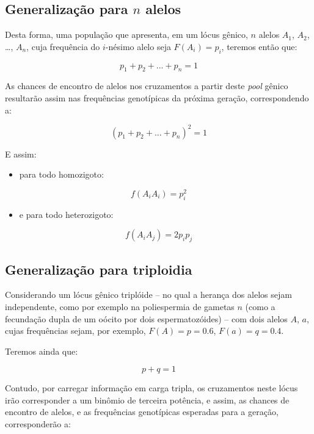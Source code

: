 \documentclass[
]{book}
\providecommand{\tightlist}{%
  \setlength{\itemsep}{0pt}\setlength{\parskip}{0pt}}
\begin{document}
\hypertarget{generalizauxe7uxe3o-para-n-alelos}{%
\subsection{\texorpdfstring{Generalização para \(n\) alelos}{Generalização para n alelos}}\label{generalizauxe7uxe3o-para-n-alelos}}

Desta forma, uma população que apresenta, em um lócus gênico, \(n\) alelos \(A_1\), \(A_2\), \ldots, \(A_n\), cuja frequência do \(i\)-nésimo alelo seja \(F(A_i) = p_i\), teremos então que:

\[p_1 + p_2 + ... + p_n = 1\]

As chances de encontro de alelos nos cruzamentos a partir deste \emph{pool} gênico resultarão assim nas frequências genotípicas da próxima geração, correspondendo a:

\[(p_1 + p_2 + ... + p_n)^2 = 1\]

E assim:

\begin{itemize}
\tightlist
\item
  para todo homozigoto:
\end{itemize}

\[f(A_{i}A_{i}) = p_i^2\]

\begin{itemize}
\tightlist
\item
  e para todo heterozigoto:
\end{itemize}

\[f(A_{i}A_{j})  = 2p_{i}p_{j}\]

\hypertarget{generalizauxe7uxe3o-para-triploidia}{%
\subsection{Generalização para triploidia}\label{generalizauxe7uxe3o-para-triploidia}}

Considerando um lócus gênico triplóide -- no qual a herança dos alelos sejam independente, como por exemplo na poliespermia de gametas \(n\) (como a fecundação dupla de um oócito por dois espermatozóides) -- com dois alelos \(A\), \(a\), cujas frequências sejam, por exemplo, \(F(A) = p = 0.6\), \(F(a) = q = 0.4\).

Teremos ainda que:

\[p + q = 1\]

Contudo, por carregar informação em carga tripla, os cruzamentos neste lócus irão corresponder a um binômio de terceira potência, e assim, as chances de encontro de alelos, e as frequências genotípicas esperadas para a geração, corresponderão a:
\end{document}
